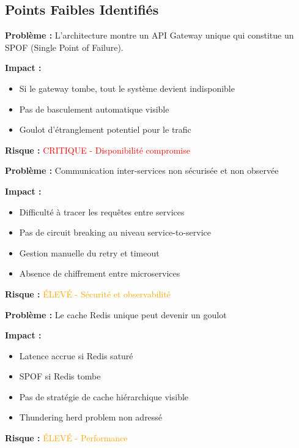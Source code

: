 \documentclass[12pt,a4paper]{article}
\begin{document}
\subsection{Points Faibles Identifiés}

\begin{tcolorbox}[title=\textbf{CRITIQUE 1 : Single Point of Failure au niveau Gateway},colback=red!10,colframe=red!60!black]
\textbf{Problème :} L'architecture montre un API Gateway unique qui constitue un SPOF (Single Point of Failure).

\textbf{Impact :}
\begin{itemize}[noitemsep]
    \item Si le gateway tombe, tout le système devient indisponible
    \item Pas de basculement automatique visible
    \item Goulot d'étranglement potentiel pour le trafic
\end{itemize}

\textbf{Risque :} \textcolor{red}{CRITIQUE - Disponibilité compromise}
\end{tcolorbox}

\begin{tcolorbox}[title=\textbf{CRITIQUE 2 : Absence de Service Mesh},colback=orange!10,colframe=orange!60!black]
\textbf{Problème :} Communication inter-services non sécurisée et non observée

\textbf{Impact :}
\begin{itemize}[noitemsep]
    \item Difficulté à tracer les requêtes entre services
    \item Pas de circuit breaking au niveau service-to-service
    \item Gestion manuelle du retry et timeout
    \item Absence de chiffrement entre microservices
\end{itemize}

\textbf{Risque :} \textcolor{orange}{ÉLEVÉ - Sécurité et observabilité}
\end{tcolorbox}

\begin{tcolorbox}[title=\textbf{CRITIQUE 3 : Cache Centralisé - Point de Contention},colback=orange!10,colframe=orange!60!black]
\textbf{Problème :} Le cache Redis unique peut devenir un goulot

\textbf{Impact :}
\begin{itemize}[noitemsep]
    \item Latence accrue si Redis saturé
    \item SPOF si Redis tombe
    \item Pas de stratégie de cache hiérarchique visible
    \item Thundering herd problem non adressé
\end{itemize}

\textbf{Risque :} \textcolor{orange}{ÉLEVÉ - Performance}
\end{tcolorbox}
\end{document}
